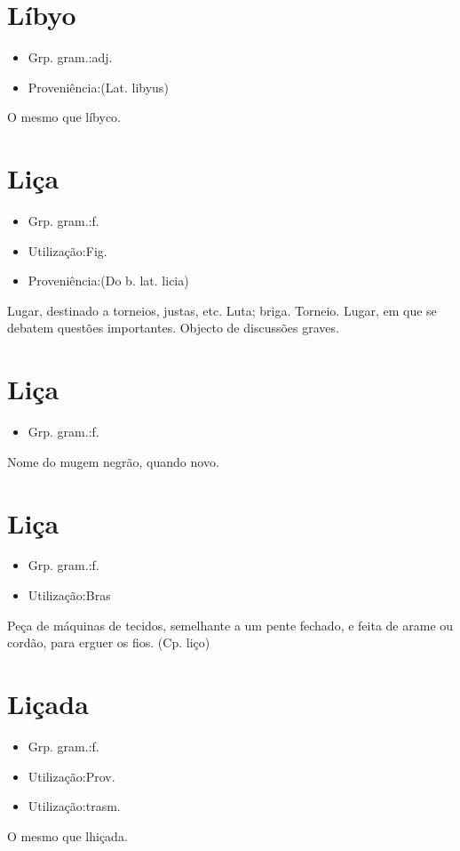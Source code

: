 \section{Líbyo}
\begin{itemize}
\item {Grp. gram.:adj.}
\end{itemize}
\begin{itemize}
\item {Proveniência:(Lat. \textunderscore libyus\textunderscore )}
\end{itemize}
O mesmo que \textunderscore líbyco\textunderscore .
\section{Liça}
\begin{itemize}
\item {Grp. gram.:f.}
\end{itemize}
\begin{itemize}
\item {Utilização:Fig.}
\end{itemize}
\begin{itemize}
\item {Proveniência:(Do b. lat. \textunderscore licia\textunderscore )}
\end{itemize}
Lugar, destinado a torneios, justas, etc.
Luta; briga.
Torneio.
Lugar, em que se debatem questões importantes.
Objecto de discussões graves.
\section{Liça}
\begin{itemize}
\item {Grp. gram.:f.}
\end{itemize}
Nome do mugem negrão, quando novo.
\section{Liça}
\begin{itemize}
\item {Grp. gram.:f.}
\end{itemize}
\begin{itemize}
\item {Utilização:Bras}
\end{itemize}
Peça de máquinas de tecidos, semelhante a um pente fechado, e feita de arame ou cordão, para erguer os fios.
(Cp. \textunderscore liço\textunderscore )
\section{Liçada}
\begin{itemize}
\item {Grp. gram.:f.}
\end{itemize}
\begin{itemize}
\item {Utilização:Prov.}
\end{itemize}
\begin{itemize}
\item {Utilização:trasm.}
\end{itemize}
O mesmo que \textunderscore lhiçada\textunderscore .
